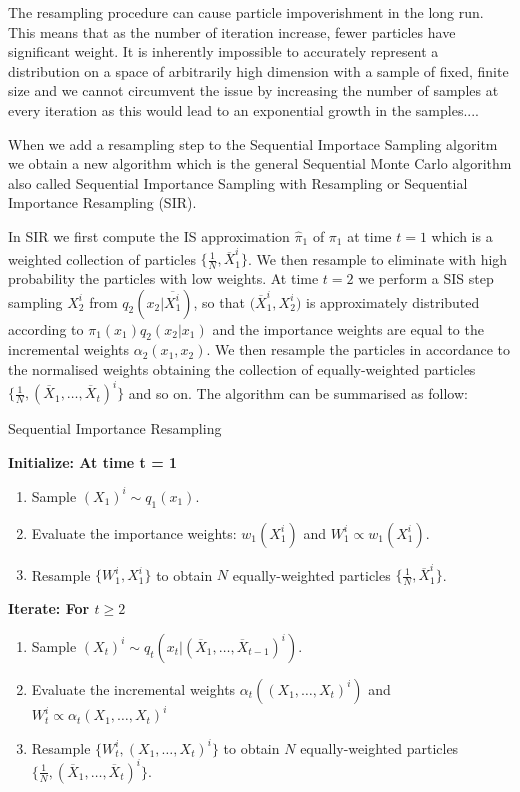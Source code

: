 \documentclass[11pt,a4paper]{article}
\begin{document}
The resampling procedure can cause particle impoverishment in the long run. This means that as the number of iteration increase, fewer particles have significant weight. It is inherently impossible to accurately represent a distribution on a space of arbitrarily high dimension with a sample of fixed, finite size and we cannot circumvent the issue by increasing the number of samples at every iteration as this would lead to an exponential growth in the samples....

When we add a resampling step to the Sequential Importace Sampling algoritm we obtain a new algorithm which is the general Sequential Monte Carlo algorithm also called Sequential Importance Sampling with Resampling or Sequential Importance Resampling (SIR).

In SIR we first compute the IS approximation $\hat{\pi}_1$ of $\pi_1$ at time $t = 1$ which is a weighted collection of particles $\{ \frac{1}{N}, \overline{X}_1^i \}$. We then resample to eliminate with high probability the particles with low weights. At time $t = 2$ we perform a SIS step sampling $X_2^i$ from $q_2(x_2 | \overline{X^i_1})$, so that $\big( \overline{X}_1^i, X^i_2 \big)$ is approximately distributed according to $\pi_1(x_1) q_2(x_2 | x_1)$ and the importance weights are equal to the incremental weights $\alpha_2(x_1, x_2)$. We then resample the particles in accordance to the normalised weights obtaining the collection of equally-weighted particles $\big\{ \frac{1}{N}, (\overline{X}_1, \dots, \overline{X}_t)^i \big\}$ and so on. The algorithm can be summarised as follow:

\begin{algorithm}[H]
\caption{Sequential Importance Resampling}\label{SIR}
    \begin{algorithmic}
        \State  \bf{Initialize:} \normalfont At time t = 1
            \begin{enumerate}
	            \item Sample $(X_{1})^i \sim q_1(x_1)$.
	            \item Evaluate the importance weights: $w_1(X_1^i)$ and $W^i_1 \propto w_1(X_1^i)$.
	            \item Resample $\{ W_1^i, X_1^i \}$ to obtain $N$ equally-weighted particles $\big\{ \frac{1}{N}, \overline{X}_1^i \big\}$.
            \end{enumerate}
        \State  \bf{Iterate:} \normalfont For $t \geq 2$
            \begin{enumerate}
	            \item Sample $(X_{t})^i \sim q_t(x_t | (\overline{X}_1, \dots, \overline{X}_{t-1})^i)$.
	            \item Evaluate the incremental weights $\alpha_t((X_1, \dots, X_t)^i)$ and $W^i_t \propto \alpha_t(X_1, \dots, X_t)^i$
	            \item  Resample $\{ W_t^i, (X_1, \dots, X_t)^i \}$ to obtain $N$ equally-weighted particles $\big\{ \frac{1}{N}, (\overline{X}_1, \dots, \overline{X}_t)^i \big\}$.
	        \end{enumerate}
    \end{algorithmic}
\end{algorithm}
\end{document}
